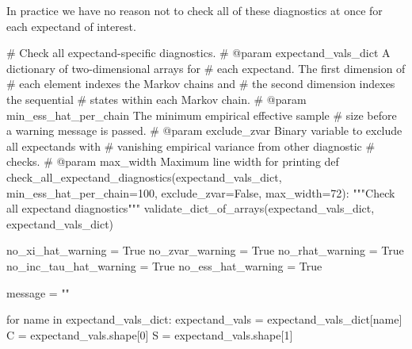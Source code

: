 \documentclass[
  letterpaper,
  DIV=11,
  numbers=noendperiod]{scrartcl}
\newenvironment{Shaded}{\begin{snugshade}}{\end{snugshade}}
\newcommand{\CommentTok}[1]{\textcolor[rgb]{0.37,0.37,0.37}{#1}}
\newcommand{\ControlFlowTok}[1]{\textcolor[rgb]{0.00,0.23,0.31}{#1}}
\newcommand{\DecValTok}[1]{\textcolor[rgb]{0.68,0.00,0.00}{#1}}
\newcommand{\KeywordTok}[1]{\textcolor[rgb]{0.00,0.23,0.31}{#1}}
\newcommand{\NormalTok}[1]{\textcolor[rgb]{0.00,0.23,0.31}{#1}}
\newcommand{\OperatorTok}[1]{\textcolor[rgb]{0.37,0.37,0.37}{#1}}
\newcommand{\StringTok}[1]{\textcolor[rgb]{0.13,0.47,0.30}{#1}}
\newcommand{\VariableTok}[1]{\textcolor[rgb]{0.07,0.07,0.07}{#1}}
\begin{document}
In practice we have no reason not to check all of these diagnostics at
once for each expectand of interest.

\begin{Shaded}
\begin{Highlighting}[]
\CommentTok{\# Check all expectand{-}specific diagnostics.}
\CommentTok{\# @param expectand\_vals\_dict A dictionary of two{-}dimensional arrays for}
\CommentTok{\#                            each expectand.  The first dimension of}
\CommentTok{\#                            each element indexes the Markov chains and}
\CommentTok{\#                            the second dimension indexes the sequential}
\CommentTok{\#                            states within each Markov chain.}
\CommentTok{\# @param min\_ess\_hat\_per\_chain The minimum empirical effective sample}
\CommentTok{\#                              size before a warning message is passed.}
\CommentTok{\# @param exclude\_zvar Binary variable to exclude all expectands with}
\CommentTok{\#                     vanishing empirical variance from other diagnostic}
\CommentTok{\#                     checks.}
\CommentTok{\# @param max\_width Maximum line width for printing}
\KeywordTok{def}\NormalTok{ check\_all\_expectand\_diagnostics(expectand\_vals\_dict,}
\NormalTok{                                    min\_ess\_hat\_per\_chain}\OperatorTok{=}\DecValTok{100}\NormalTok{,}
\NormalTok{                                    exclude\_zvar}\OperatorTok{=}\VariableTok{False}\NormalTok{,}
\NormalTok{                                    max\_width}\OperatorTok{=}\DecValTok{72}\NormalTok{):}
  \CommentTok{"""Check all expectand diagnostics"""}
\NormalTok{  validate\_dict\_of\_arrays(expectand\_vals\_dict, }\StringTok{\textquotesingle{}expectand\_vals\_dict\textquotesingle{}}\NormalTok{)}
  
\NormalTok{  no\_xi\_hat\_warning }\OperatorTok{=} \VariableTok{True} 
\NormalTok{  no\_zvar\_warning }\OperatorTok{=} \VariableTok{True}
\NormalTok{  no\_rhat\_warning }\OperatorTok{=} \VariableTok{True}
\NormalTok{  no\_inc\_tau\_hat\_warning }\OperatorTok{=} \VariableTok{True}
\NormalTok{  no\_ess\_hat\_warning }\OperatorTok{=} \VariableTok{True}
  
\NormalTok{  message }\OperatorTok{=} \StringTok{""}
  
  \ControlFlowTok{for}\NormalTok{ name }\KeywordTok{in}\NormalTok{ expectand\_vals\_dict:}
\NormalTok{    expectand\_vals }\OperatorTok{=}\NormalTok{ expectand\_vals\_dict[name]}
\NormalTok{    C }\OperatorTok{=}\NormalTok{ expectand\_vals.shape[}\DecValTok{0}\NormalTok{]}
\NormalTok{    S }\OperatorTok{=}\NormalTok{ expectand\_vals.shape[}\DecValTok{1}\NormalTok{]}
    

\end{Highlighting}
\end{Shaded}
\end{document}
